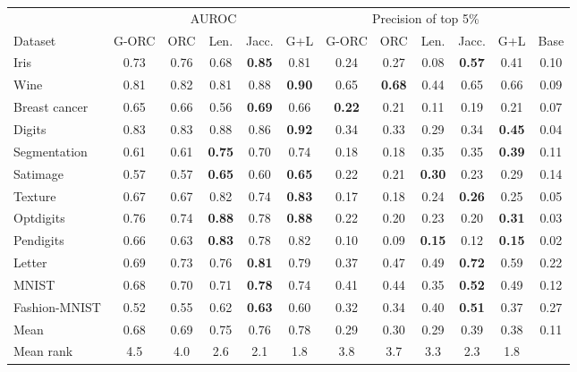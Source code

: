 \begin{tabular}{@{}lcccccccccc c@{}}
\toprule
 & \multicolumn{5}{c}{AUROC} & \multicolumn{5}{c}{Precision of top 5\%} & \\
\cmidrule(lr){2-6}\cmidrule(lr){7-11}
Dataset & G-ORC & ORC & Len. & Jacc. & G+L & G-ORC & ORC & Len. & Jacc. & G+L & Base \\
\midrule
Iris & 0.73 & 0.76 & 0.68 & \textbf{0.85} & 0.81 & 0.24 & 0.27 & 0.08 & \textbf{0.57} & 0.41 & 0.10 \\
Wine & 0.81 & 0.82 & 0.81 & 0.88 & \textbf{0.90} & 0.65 & \textbf{0.68} & 0.44 & 0.65 & 0.66 & 0.09 \\
Breast cancer & 0.65 & 0.66 & 0.56 & \textbf{0.69} & 0.66 & \textbf{0.22} & 0.21 & 0.11 & 0.19 & 0.21 & 0.07 \\
Digits & 0.83 & 0.83 & 0.88 & 0.86 & \textbf{0.92} & 0.34 & 0.33 & 0.29 & 0.34 & \textbf{0.45} & 0.04 \\
Segmentation & 0.61 & 0.61 & \textbf{0.75} & 0.70 & 0.74 & 0.18 & 0.18 & 0.35 & 0.35 & \textbf{0.39} & 0.11 \\
Satimage & 0.57 & 0.57 & \textbf{0.65} & 0.60 & \textbf{0.65} & 0.22 & 0.21 & \textbf{0.30} & 0.23 & 0.29 & 0.14 \\
Texture & 0.67 & 0.67 & 0.82 & 0.74 & \textbf{0.83} & 0.17 & 0.18 & 0.24 & \textbf{0.26} & 0.25 & 0.05 \\
Optdigits & 0.76 & 0.74 & \textbf{0.88} & 0.78 & \textbf{0.88} & 0.22 & 0.20 & 0.23 & 0.20 & \textbf{0.31} & 0.03 \\
Pendigits & 0.66 & 0.63 & \textbf{0.83} & 0.78 & 0.82 & 0.10 & 0.09 & \textbf{0.15} & 0.12 & \textbf{0.15} & 0.02 \\
Letter & 0.69 & 0.73 & 0.76 & \textbf{0.81} & 0.79 & 0.37 & 0.47 & 0.49 & \textbf{0.72} & 0.59 & 0.22 \\
MNIST & 0.68 & 0.70 & 0.71 & \textbf{0.78} & 0.74 & 0.41 & 0.44 & 0.35 & \textbf{0.52} & 0.49 & 0.12 \\
Fashion-MNIST & 0.52 & 0.55 & 0.62 & \textbf{0.63} & 0.60 & 0.32 & 0.34 & 0.40 & \textbf{0.51} & 0.37 & 0.27 \\
\midrule
Mean & 0.68 & 0.69 & 0.75 & 0.76 & 0.78 & 0.29 & 0.30 & 0.29 & 0.39 & 0.38 & 0.11 \\
Mean rank & 4.5 & 4.0 & 2.6 & 2.1 & 1.8 & 3.8 & 3.7 & 3.3 & 2.3 & 1.8 &  \\
\bottomrule
\end{tabular}

